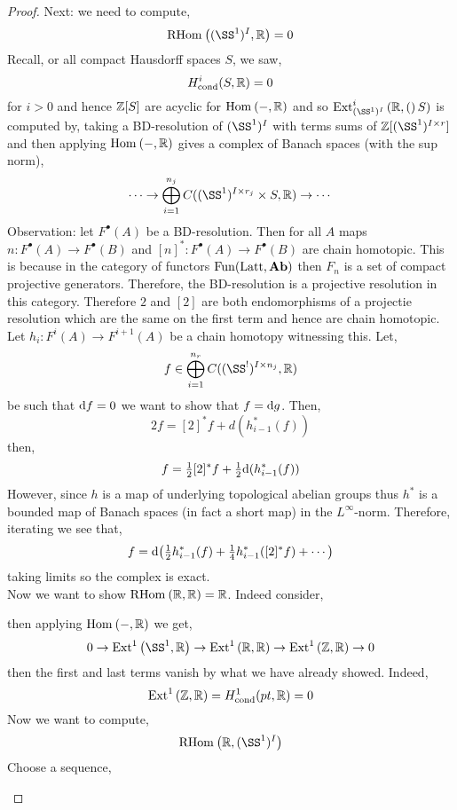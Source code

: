 \documentclass[12pt]{article}
\newcommand{\cond}{\text{cond}}
\begin{document}
\begin{proof}
Next: we need to compute,
\[ \RHom{}{(\SS^1)^I}{\RR} = 0 \]
Recall, or all compact Hausdorff spaces $S$, we saw,
\[ H^i_{\cond}(S, \RR) = 0 \]
for $i > 0$ and hence $\mathbb{Z}[S]$ are acyclic for $\mathrm{Hom}_{} \left( -, \mathbb{R} \right)$ and so $\Ext{i}{(\SS^1)^I}{\RR}(S)$ is computed by, taking a BD-resolution of $(\SS^1)^I$ with terms sums of $\Z[(\SS^1)^{I \times r}]$ and then applying $\mathrm{Hom}_{} \left( -, \mathbb{R} \right)$ gives a complex of Banach spaces (with the sup norm),
\[ \cdots \to \bigoplus_{i = 1}^{n_j} C((\SS^1)^{I \times r_j} \times S, \RR) \to \cdots \]
Observation: let $F^\bullet(A)$ be a BD-resolution. Then for all $A$ maps $n : F^\bullet(A) \to F^\bullet(B)$ and $[n]^* : F^\bullet(A) \to F^\bullet(B)$ are chain homotopic. This is because in the category of functors $\mathrm{Fun}(\text{Latt}, \mathbf{Ab})$ then $F_n$ is a set of compact projective generators. Therefore, the BD-resolution is a projective resolution in this category. Therefore $2$ and $[2]$ are both endomorphisms of a projectie resolution which are the same on the first term and hence are chain homotopic.
\bigskip
Let $h_i : F^i(A) \to F^{i+1}(A)$ be a chain homotopy witnessing this. Let,
\[ f \in \bigoplus_{i = 1}^{n_r} C((\SS^!)^{I \times n_j}, \RR) \]
be such that $\mathrm{d}{f} = 0$ we want to show that $f = \mathrm{d}{g}$. Then,
\[ 2 f = [2]^* f + d{(h^*_{i-1}(f))} \]
then,
\[ f = \tfrac{1}{2} [2]^* f + \tfrac{1}{2} \mathrm{d}{(h^*_{i-1}(f))} \]
However, since $h$ is a map of underlying topological abelian groups thus $h^*$ is a bounded map of Banach spaces (in fact a short map) in the $L^{\infty}$-norm. Therefore, iterating we see that,
\[ f = \mathrm{d}{ \left( \tfrac{1}{2} h_{i-1}^*(f) + \tfrac{1}{4} h^*_{i-1}([2]^* f) + \cdots \right)} \]
taking limits so the complex is exact.
\bigskip\\
Now we want to show $\mathrm{RHom}_{} \left( \mathbb{R}, \mathbb{R} \right) = \mathbb{R}$. Indeed consider,
\begin{center}
\end{center}
then applying $\mathrm{Hom}_{} \left( -, \mathbb{R} \right)$ we get,
\[ 0 \to \Ext{1}{}{\SS^1}{\RR} \to \Ext{1}{}{\RR}{\RR} \to \Ext{1}{}{\ZZ}{\RR} \to 0 \]
then the first and last terms vanish by what we have already showed. Indeed,
\[ \Ext{1}{}{\ZZ}{\RR} = H^1_{\cond}(pt, \RR) = 0 \]
Now we want to compute,
\[ \RHom{}{\RR}{(\SS^1)^I} \]
Choose a sequence,
\begin{center}
\end{center}
\end{proof}
\end{document}

